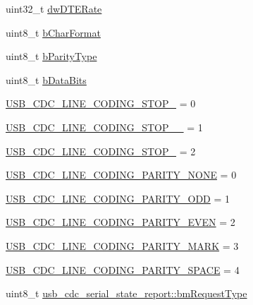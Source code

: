 \begin{DoxyCompactItemize}
\item 
uint32\-\_\-t \hyperlink{group___p_i_o_s___u_s_b___d_e_f_s_ga1c7eaa2f09ca8253de1711d01e05e02c}{dw\-D\-T\-E\-Rate}
\item 
uint8\-\_\-t \hyperlink{group___p_i_o_s___u_s_b___d_e_f_s_ga296b7b4f7eaba228afa94b5f9854b86b}{b\-Char\-Format}
\item 
uint8\-\_\-t \hyperlink{group___p_i_o_s___u_s_b___d_e_f_s_ga47f5ab7fcc915dedd560214e61438bc3}{b\-Parity\-Type}
\item 
uint8\-\_\-t \hyperlink{group___p_i_o_s___u_s_b___d_e_f_s_gaeb01baccbd5328de664ba39a4c295941}{b\-Data\-Bits}
\item 
\hyperlink{group___p_i_o_s___u_s_b___d_e_f_s_gac4eddf0a8ee341b7b3718d54fd8d3aca}{\-U\-S\-B\-\_\-\-C\-D\-C\-\_\-\-L\-I\-N\-E\-\_\-\-C\-O\-D\-I\-N\-G\-\_\-\-S\-T\-O\-P\-\_} = 0
\item 
\hyperlink{group___p_i_o_s___u_s_b___d_e_f_s_ga7e2d9fdd2a6d8787acb3822557bccf2f}{\-U\-S\-B\-\_\-\-C\-D\-C\-\_\-\-L\-I\-N\-E\-\_\-\-C\-O\-D\-I\-N\-G\-\_\-\-S\-T\-O\-P\-\_\-\_} = 1
\item 
\hyperlink{group___p_i_o_s___u_s_b___d_e_f_s_ga3538b3fcf1ee3c5f9f5c6440ee992bab}{\-U\-S\-B\-\_\-\-C\-D\-C\-\_\-\-L\-I\-N\-E\-\_\-\-C\-O\-D\-I\-N\-G\-\_\-\-S\-T\-O\-P\-\_} = 2
\item 
\hyperlink{group___p_i_o_s___u_s_b___d_e_f_s_gaac4a8093dc70d2faba2bfbecd8f3925e}{\-U\-S\-B\-\_\-\-C\-D\-C\-\_\-\-L\-I\-N\-E\-\_\-\-C\-O\-D\-I\-N\-G\-\_\-\-P\-A\-R\-I\-T\-Y\-\_\-\-N\-O\-N\-E} = 0
\item 
\hyperlink{group___p_i_o_s___u_s_b___d_e_f_s_gaae8333b5bc558121cfbf15fa45a3995b}{\-U\-S\-B\-\_\-\-C\-D\-C\-\_\-\-L\-I\-N\-E\-\_\-\-C\-O\-D\-I\-N\-G\-\_\-\-P\-A\-R\-I\-T\-Y\-\_\-\-O\-D\-D} = 1
\item 
\hyperlink{group___p_i_o_s___u_s_b___d_e_f_s_ga9368f7f6c69c75dcf7309d538ac75844}{\-U\-S\-B\-\_\-\-C\-D\-C\-\_\-\-L\-I\-N\-E\-\_\-\-C\-O\-D\-I\-N\-G\-\_\-\-P\-A\-R\-I\-T\-Y\-\_\-\-E\-V\-E\-N} = 2
\item 
\hyperlink{group___p_i_o_s___u_s_b___d_e_f_s_ga88095a84c73187be8de85b0d2570a1ac}{\-U\-S\-B\-\_\-\-C\-D\-C\-\_\-\-L\-I\-N\-E\-\_\-\-C\-O\-D\-I\-N\-G\-\_\-\-P\-A\-R\-I\-T\-Y\-\_\-\-M\-A\-R\-K} = 3
\item 
\hyperlink{group___p_i_o_s___u_s_b___d_e_f_s_ga8e20e35ec70602f6991738f7687070ec}{\-U\-S\-B\-\_\-\-C\-D\-C\-\_\-\-L\-I\-N\-E\-\_\-\-C\-O\-D\-I\-N\-G\-\_\-\-P\-A\-R\-I\-T\-Y\-\_\-\-S\-P\-A\-C\-E} = 4
\item 
uint8\-\_\-t \hyperlink{group___p_i_o_s___u_s_b___d_e_f_s_gaaadf08281b8967b649e2ce6cef9f9279}{usb\-\_\-cdc\-\_\-serial\-\_\-state\-\_\-report\-::bm\-Request\-Type}

\end{DoxyCompactItemize}
